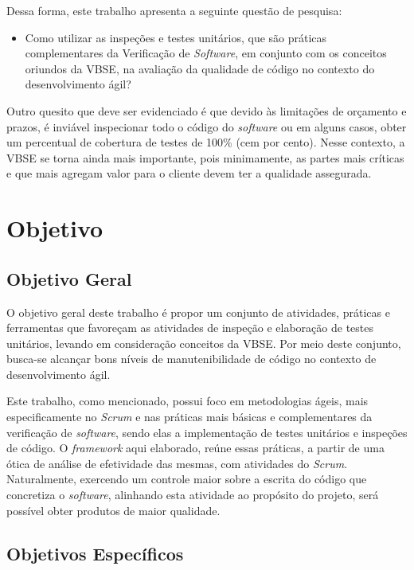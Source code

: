 Dessa forma, este trabalho apresenta a seguinte questão de pesquisa:

\begin{itemize}
	\item Como utilizar as inspeções e testes unitários, que são práticas complementares da Verificação de \textit{Software}, em conjunto com os conceitos oriundos da VBSE, na avaliação da qualidade de código no contexto do desenvolvimento ágil?
\end{itemize}

Outro quesito que deve ser evidenciado é que devido às limitações de orçamento e prazos, é inviável inspecionar todo o código do \textit{software} ou em alguns casos, obter um percentual de cobertura de testes de 100\% (cem por cento). Nesse contexto, a VBSE se torna ainda mais importante, pois minimamente, as partes mais críticas e que mais agregam valor para o cliente devem ter a qualidade assegurada.

\section{Objetivo}

\subsection{Objetivo Geral}

O objetivo geral deste trabalho é propor um conjunto de atividades, práticas e ferramentas que favoreçam as atividades de inspeção e elaboração de testes unitários, levando em consideração conceitos da VBSE. Por meio deste conjunto, busca-se alcançar bons níveis de manutenibilidade de código no contexto de desenvolvimento ágil.

Este trabalho, como mencionado, possui foco em metodologias ágeis, mais especificamente no \textit{Scrum} e nas práticas mais básicas e complementares da verificação de \textit{software}, sendo elas a implementação de testes unitários e inspeções de código. O \textit{framework} aqui elaborado, reúne essas práticas, a partir de uma ótica de análise de efetividade das mesmas, com atividades do \textit{Scrum}. Naturalmente, exercendo um controle maior sobre a escrita do código que concretiza o \textit{software}, alinhando esta atividade ao propósito do projeto, será possível obter produtos de maior qualidade.

\subsection{Objetivos Específicos}

